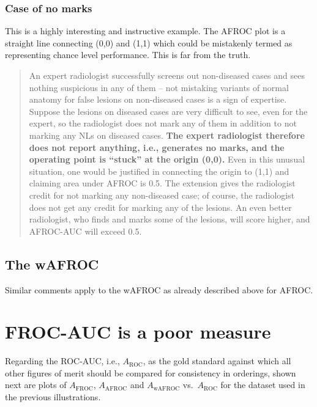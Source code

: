 \documentclass[
]{book}
\begin{document}
\hypertarget{empirical-empirical-instructive-cases-AFROC-no-marks}{%
\subsubsection{Case of no marks}\label{empirical-empirical-instructive-cases-AFROC-no-marks}}

This is a highly interesting and instructive example. The AFROC plot is a straight line connecting (0,0) and (1,1) which could be mistakenly termed as representing chance level performance. This is far from the truth.

\begin{quote}
An expert radiologist successfully screens out non-diseased cases and sees nothing suspicious in any of them -- not mistaking variants of normal anatomy for false lesions on non-diseased cases is a sign of expertise. Suppose the lesions on diseased cases are very difficult to see, even for the expert, so the radiologist does not mark any of them in addition to not marking any NLs on diseased cases. \textbf{The expert radiologist therefore does not report anything, i.e., generates no marks, and the operating point is ``stuck'' at the origin (0,0).} Even in this unusual situation, one would be justified in connecting the origin to (1,1) and claiming area under AFROC is 0.5. The extension gives the radiologist credit for not marking any non-diseased case; of course, the radiologist does not get any credit for marking any of the lesions. An even better radiologist, who finds and marks some of the lesions, will score higher, and AFROC-AUC will exceed 0.5.
\end{quote}

\hypertarget{empirical-instructive-cases-wAFROC}{%
\subsection{The wAFROC}\label{empirical-instructive-cases-wAFROC}}

Similar comments apply to the wAFROC as already described above for AFROC.

\hypertarget{empirical-froc-auc-poor}{%
\section{FROC-AUC is a poor measure}\label{empirical-froc-auc-poor}}

Regarding the ROC-AUC, i.e., \(A_{\text{ROC}}\), as the gold standard against which all other figures of merit should be compared for consistency in orderings, shown next are plots of \(A_{\text{FROC}}\), \(A_{\text{AFROC}}\) and \(A_{\text{wAFROC}}\) vs.~\(A_{\text{ROC}}\) for the dataset used in the previous illustrations.
\end{document}
